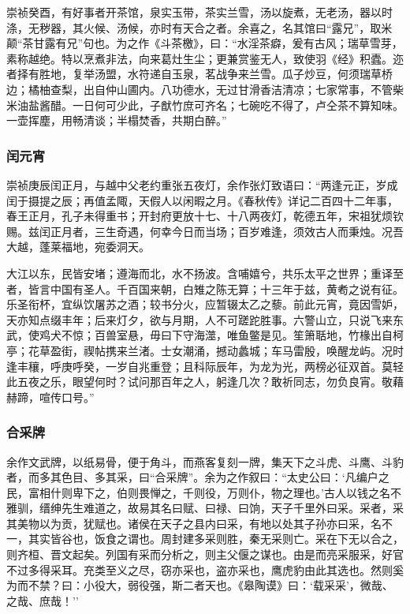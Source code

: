 \documentclass[]{article}
\begin{document}
崇祯癸酉，有好事者开茶馆，泉实玉带，茶实兰雪，汤以旋煮，无老汤，器以时涤，无秽器，其火候、汤候，亦时有天合之者。余喜之，名其馆曰``露兄''，取米颠``茶甘露有兄''句也。为之作《斗茶檄》，曰：``水淫茶癖，爰有古风；瑞草雪芽，素称越绝。特以烹煮非法，向来葛灶生尘；更兼赏鉴无人，致使羽《经》积蠹。迩者择有胜地，复举汤盟，水符递自玉泉，茗战争来兰雪。瓜子炒豆，何须瑞草桥边；橘柚查梨，出自仲山圃内。八功德水，无过甘滑香洁清凉；七家常事，不管柴米油盐酱醋。一日何可少此，子猷竹庶可齐名；七碗吃不得了，卢仝茶不算知味。一壶挥塵，用畅清谈；半榻焚香，共期白醉。''

\hypertarget{header-n646}{%
\subsubsection{闰元宵}\label{header-n646}}

崇祯庚辰闰正月，与越中父老约重张五夜灯，余作张灯致语曰：``两逢元正，岁成闰于摄提之辰；再值孟陬，天假人以闲暇之月。《春秋传》详记二百四十二年事，春王正月，孔子未得重书；开封府更放十七、十八两夜灯，乾德五年，宋祖犹烦钦赐。兹闰正月者，三生奇遇，何幸今日而当场；百岁难逢，须效古人而秉烛。况吾大越，蓬莱福地，宛委洞天。

大江以东，民皆安堵；遵海而北，水不扬波。含哺嬉兮，共乐太平之世界；重译至者，皆言中国有圣人。千百国来朝，白雉之陈无算；十三年于兹，黄耇之说有征。乐圣衔杯，宜纵饮屠苏之酒；较书分火，应暂辍太乙之藜。前此元宵，竟因雪妒，天亦知点缀丰年；后来灯夕，欲与月期，人不可蹉跎胜事。六警山立，只说飞来东武，使鸡犬不惊；百兽室悬，毋曰下守海澨，唯鱼鳖是见。笙箫聒地，竹椽出自柯亭；花草盈街，禊帖携来兰渚。士女潮涌，撼动蠡城；车马雷殷，唤醒龙屿。况时逢丰穰，呼庚呼癸，一岁自兆重登；且科际辰年，为龙为光，两榜必征双首。莫轻此五夜之乐，眼望何时？试问那百年之人，躬逢几次？敢祈同志，勿负良宵。敬藉赫蹄，喧传口号。''

\hypertarget{header-n651}{%
\subsubsection{合采牌}\label{header-n651}}

余作文武牌，以纸易骨，便于角斗，而燕客复刻一牌，集天下之斗虎、斗鹰、斗豹者，而多其色目、多其采，曰``合采牌''。余为之作叙曰：``太史公曰：`凡编户之民，富相什则卑下之，伯则畏惮之，千则役，万则仆，物之理也。'古人以钱之名不雅驯，缙绅先生难道之，故易其名曰赋、曰禄、曰饷，天子千里外曰采。采者，采其美物以为贡，犹赋也。诸侯在天子之县内曰采，有地以处其子孙亦曰采，名不一，其实皆谷也，饭食之谓也。周封建多采则胜，秦无采则亡。采在下无以合之，则齐桓、晋文起矣。列国有采而分析之，则主父偃之谋也。由是而亮采服采，好官不过多得采耳。充类至义之尽，窃亦采也，盗亦采也，鹰虎豹由此其选也。然则奚为而不禁？曰：小役大，弱役强，斯二者天也。《皋陶谟》曰：`载采采'，微哉、之哉、庶哉！''
\end{document}
